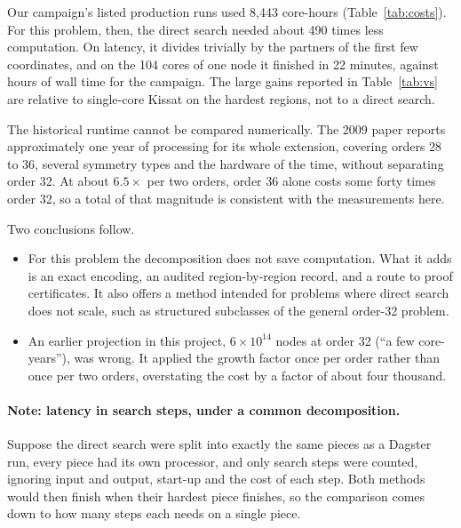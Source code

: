 \documentclass[11pt,a4paper]{article}
\theoremstyle{definition}
\begin{document}
Our campaign's listed production runs used 8{,}443 core-hours (Table~\ref{tab:costs}). For this
problem, then, the direct search needed about 490 times less computation. On latency, it divides
trivially by the partners of the first few coordinates, and on the 104 cores of one node it finished in
22 minutes, against hours of wall time for the campaign. The large gains reported in Table~\ref{tab:vs} are relative to single-core Kissat on the
hardest regions, not to a direct search.

The historical runtime cannot be compared numerically. The 2009 paper reports approximately one year
of processing for its whole extension, covering orders 28 to 36, several symmetry types and the
hardware of the time, without separating order 32. At about $6.5\times$ per two orders, order 36 alone
costs some forty times order 32, so a total of that magnitude is consistent with the measurements
here.

Two conclusions follow.
\begin{itemize}
\item For this problem the decomposition does not save computation. What it adds is an exact
encoding, an audited region-by-region record, and a route to proof certificates. It also offers a
method intended for problems where direct search does not scale, such as structured subclasses of
the general order-32 problem.
\item An earlier projection in this project, $6\times10^{14}$ nodes at order 32 (``a few
core-years''), was wrong. It applied the growth factor once per order rather than once per two orders,
overstating the cost by a factor of about four thousand.
\end{itemize}

\paragraph{Note: latency in search steps, under a common decomposition.}
Suppose the direct search were split into exactly the same pieces as a Dagster run, every piece
had its own processor, and only search steps were counted, ignoring input and output, start-up
and the cost of each step. Both methods would then finish when their hardest piece finishes, so
the comparison comes down to how many steps each needs on a single piece.
\end{document}
